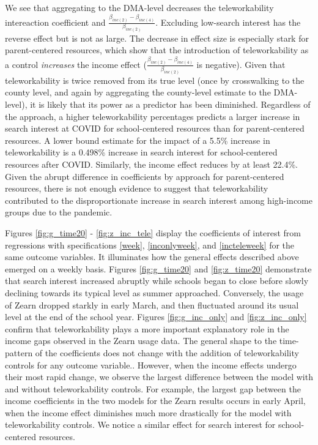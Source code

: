 We see that aggregating to the DMA-level decreases the teleworkability intereaction coefficient and $\frac{\beta_{inc\left(2\right)}-\beta_{inc\left(4\right)}}{\beta_{inc\left(2\right)}}$. Excluding low-search interest has the reverse effect but is not as large. The decrease in effect size is especially stark for parent-centered resources, which show that the introduction of teleworkability as a control \textit{increases} the income effect ($\frac{\beta_{inc\left(2\right)}-\beta_{inc\left(4\right)}}{\beta_{inc\left(2\right)}}$ is negative). Given that teleworkability is twice removed from its true level (once by crosswalking to the county level, and again by aggregating the county-level estimate to the DMA-level), it is likely that its power as a predictor has been diminished. Regardless of the approach, a higher teleworkability percentages predicts a larger increase in search interest at COVID for school-centered resources than for parent-centered resources. A lower bound estimate for the impact of a 5.5\% increase in teleworkability is a 0.498\% increase in search interest for school-centered resources after COVID. Similarly, the income effect reduces by at least 22.4\%. Given the abrupt difference in coefficients by approach for parent-centered resources, there is not enough evidence to suggest that teleworkability contributed to the disproportionate increase in search interest among high-income groups due to the pandemic. \par
	Figures \ref{fig:g_time20} - \ref{fig:z_inc_tele} display the coefficients of interest from regressions with specifications \ref{week}, \ref{inconlyweek}, and \ref{incteleweek} for the same outcome variables. It illuminates how the general effects described above emerged on a weekly basis. Figures \ref{fig:g_time20} and \ref{fig:z_time20} demonstrate that search interest increased abruptly while schools began to close before slowly declining towards its typical level as summer approached. Conversely, the usage of Zearn dropped starkly in early March, and then fluctuated around its usual level at the end of the school year. Figures \ref{fig:g_inc_only} and \ref{fig:z_inc_only} confirm that teleworkability plays a more important explanatory role in the income gaps observed in the Zearn usage data. The general shape to the time-pattern of the coefficients does not change with the addition of teleworkability controls for any outcome variable.. However, when the income effects undergo their most rapid change, we observe the largest difference between the model with and without teleworkability controls. For example, the largest gap between the income coefficients in the two models for the Zearn results occurs in early April, when the income effect diminishes much more drastically for the model with teleworkability controls. We notice a similar effect for search interest for school-centered resources. \par

